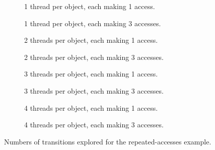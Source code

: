 \documentclass[12pt,a4paper,twoside,openany]{report}
\newenvironment{figtile} %
{\begin{subfigure}{0.48\textwidth}
		\def\svgwidth{\textwidth}
		\captionsetup{font=footnotesize}
	}
	{\end{subfigure}}
\begin{document}
\begin{figure}
	\centering
	\footnotesize
	\begin{figtile}
		
		\caption{1 thread per object,
			each making 1 access.}
	\end{figtile}%
	\quad
	\begin{figtile}
		
		\caption{1 thread per object,
			each making 3 accesses.}
	\end{figtile}
	\begin{figtile}
		
		\caption{2 threads per object,
			each making 1 access.}
	\end{figtile}%
	\quad
	\begin{figtile}
		
		\caption{2 threads per object,
			each making 3 accesses.}
	\end{figtile}
	\begin{figtile}
		
		\caption{3 threads per object,
			each making 1 access.}
	\end{figtile}%
	\quad
	\begin{figtile}
		
		\caption{3 threads per object,
			each making 3 accesses.}
	\end{figtile}
	\begin{figtile}
		
		\caption{4 threads per object,
			each making 1 access.}
	\end{figtile}%
	\quad
	\begin{figtile}
		
		\caption{4 threads per object,
			each making 3 accesses.}
		\label{fig:repeated-access-trans-h}
	\end{figtile}
	\caption{Numbers of transitions
		explored for the repeated-accesses example.}
	\label{fig:repeated-access-trans}
\end{figure}
\end{document}
